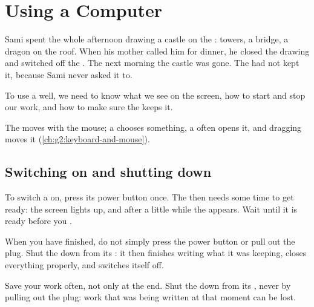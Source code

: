 \chapter{Using a Computer}\label{ch:g2:using-a-computer}

Sami spent the whole afternoon drawing a castle on the : towers, a
bridge, a dragon on the roof. When his mother called him for dinner, he closed
the drawing and switched off the . The next morning the castle was
gone. The  had not kept it, because Sami never asked it to.

To use a  well, we need to know what we see on the screen, how to
start and stop our work, and how to make sure the  keeps it.

\begin{recall}
The  moves with the mouse; a  chooses something, a 
often opens it, and dragging moves it (\cref{ch:g2:keyboard-and-mouse}).
\end{recall}

\section{Switching on and shutting down}

To switch a  on, press its power button once. The  then needs
some time to get ready: the screen lights up, and after a little while the
 appears. Wait until it is ready before you .

When you have finished, do not simply press the power button or pull out the
plug. Shut the  down from its : it then finishes writing what it
was keeping, closes everything properly, and switches itself off.

\begin{safety}
Save your work often, not only at the end. Shut the  down from its
, never by pulling out the plug: work that was being written at that moment
can be lost.
\end{safety}

